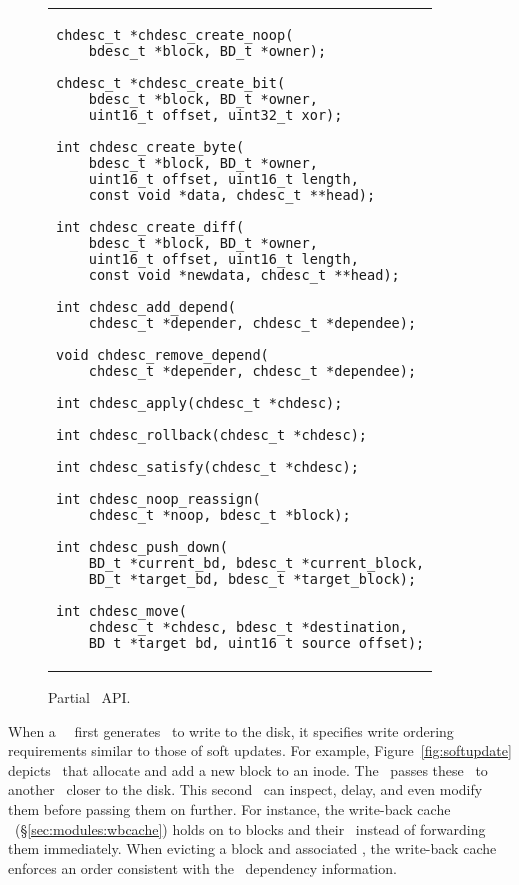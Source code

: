\begin{figure}[htb]
\vskip-14pt
\begin{tabular}{@{\hskip0.25in}p{2in}@{}}
\begin{scriptsize}
\begin{verbatim}
chdesc_t *chdesc_create_noop(
    bdesc_t *block, BD_t *owner);

chdesc_t *chdesc_create_bit(
    bdesc_t *block, BD_t *owner,
    uint16_t offset, uint32_t xor);

int chdesc_create_byte(
    bdesc_t *block, BD_t *owner,
    uint16_t offset, uint16_t length,
    const void *data, chdesc_t **head);

int chdesc_create_diff(
    bdesc_t *block, BD_t *owner,
    uint16_t offset, uint16_t length,
    const void *newdata, chdesc_t **head);

int chdesc_add_depend(
    chdesc_t *depender, chdesc_t *dependee);

void chdesc_remove_depend(
    chdesc_t *depender, chdesc_t *dependee);

int chdesc_apply(chdesc_t *chdesc);

int chdesc_rollback(chdesc_t *chdesc);

int chdesc_satisfy(chdesc_t *chdesc);

int chdesc_noop_reassign(
    chdesc_t *noop, bdesc_t *block);

int chdesc_push_down(
    BD_t *current_bd, bdesc_t *current_block,
    BD_t *target_bd, bdesc_t *target_block);

int chdesc_move(
    chdesc_t *chdesc, bdesc_t *destination,
    BD_t *target_bd, uint16_t source_offset);
\end{verbatim}
\end{scriptsize}
\end{tabular}
\vspace{-10pt}
\caption{\label{fig:chdapi} Partial \chdesc\ API.}
\end{figure}

When a \Kudos\ \module\ first generates \chdescs\ to write to the disk, it
specifies write ordering requirements similar to those of soft updates. For
example, Figure~\ref{fig:softupdate} depicts \chdescs\ that allocate and add a
new block to an inode. The \module\ passes these \chdescs\ to another \module\
closer to the disk. This second \module\ can inspect, delay, and even modify
them before passing them on further. For instance, the write-back cache \module\
(\S\ref{sec:modules:wbcache}) holds on to blocks and their \chdescs\ instead of
forwarding them immediately. When evicting a block and associated \chdescs, the
write-back cache enforces an order consistent with the \chdesc\ dependency
information.

